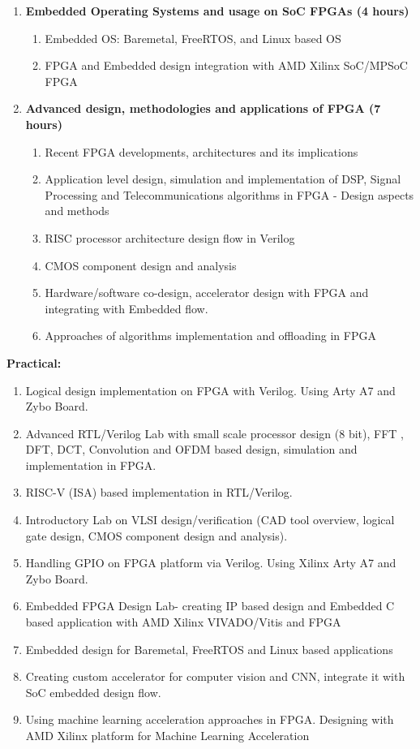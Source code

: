 \begin{enumerate}
  \item \textbf{Embedded Operating Systems and usage on SoC FPGAs \hfill (4 hours)}
    \begin{enumerate}
      \item Embedded OS: Baremetal, FreeRTOS, and Linux based OS
      \item FPGA and Embedded design integration with AMD Xilinx SoC/MPSoC FPGA
    \end{enumerate}
    \vs

  \item \textbf{Advanced design, methodologies and applications of FPGA \hfill (7 hours)}
    \begin{enumerate}
      \item Recent FPGA developments, architectures and its implications
      \item Application level design, simulation and implementation of DSP, Signal Processing and Telecommunications algorithms in FPGA - Design aspects and methods
      \item RISC processor architecture design flow in Verilog
      \item CMOS component design and analysis
      \item Hardware/software co-design, accelerator design with FPGA and integrating with Embedded flow.
      \item Approaches of algorithms implementation and offloading in FPGA
    \end{enumerate}
    \vs
\end{enumerate}

\Vs
\noindent \textbf{Practical:}
  \begin{enumerate}[label=\arabic*.]
    \item Logical design implementation on FPGA with Verilog. Using Arty A7 and Zybo Board.
    \item Advanced RTL/Verilog Lab with small scale processor design (8 bit), FFT , DFT, DCT, Convolution and OFDM based design, simulation and implementation in FPGA.
    \item RISC-V (ISA) based implementation in RTL/Verilog.
    \item Introductory Lab on VLSI design/verification (CAD tool overview, logical gate design, CMOS component design and analysis).
    \item Handling GPIO on FPGA platform via Verilog. Using Xilinx Arty A7 and Zybo Board.
    \item Embedded FPGA Design Lab- creating IP based design and Embedded C based application with AMD Xilinx VIVADO/Vitis and FPGA
    \item Embedded design for Baremetal, FreeRTOS and Linux based applications
    \item Creating custom accelerator for computer vision and CNN, integrate it with SoC embedded design flow.
    \item Using machine learning acceleration approaches in FPGA. Designing with AMD Xilinx platform for Machine Learning Acceleration
  \end{enumerate}
\Vs

